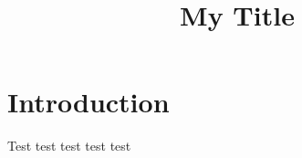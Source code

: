 \documentclass[11pt,twocolumn]{revtex4-2}
\begin{document}
\title{My Title}

\maketitle

\section{Introduction}

Test test test test test 
\end{document}
